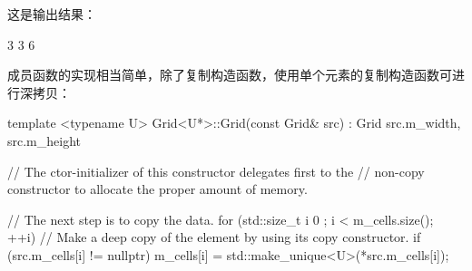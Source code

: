 这是输出结果：

\begin{shell}
3
3
6
\end{shell}

成员函数的实现相当简单，除了复制构造函数，使用单个元素的复制构造函数可进行深拷贝：

\begin{cpp}
template <typename U>
Grid<U*>::Grid(const Grid& src)
    : Grid { src.m_width, src.m_height }
{
    // The ctor-initializer of this constructor delegates first to the
    // non-copy constructor to allocate the proper amount of memory.

    // The next step is to copy the data.
    for (std::size_t i { 0 }; i < m_cells.size(); ++i) {
        // Make a deep copy of the element by using its copy constructor.
        if (src.m_cells[i] != nullptr) {
            m_cells[i] = std::make_unique<U>(*src.m_cells[i]);
        }
    }
}
\end{cpp}






































